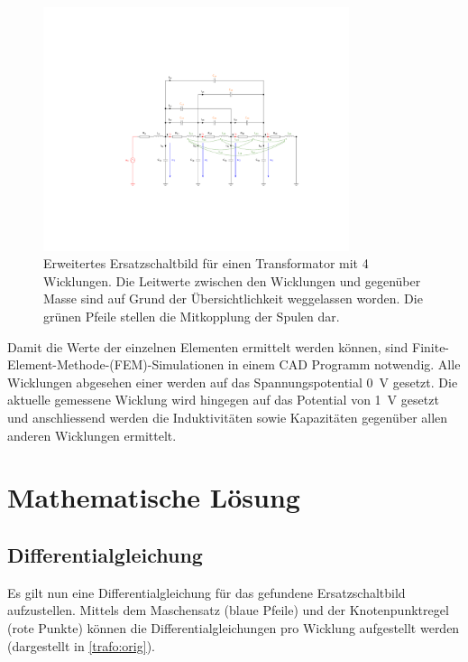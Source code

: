 \begin{refsection}
\begin{figure}
	\centering
	\includegraphics[width=0.8\textwidth]{trafo/Trafo_Modell.pdf}
	\caption[Erweitertes Ersatzschaltbild für einen Transformator]{Erweitertes Ersatzschaltbild für einen Transformator mit 4 Wicklungen. Die Leitwerte zwischen den Wicklungen und gegenüber Masse sind auf Grund der Übersichtlichkeit weggelassen worden. Die grünen Pfeile stellen die Mitkopplung der Spulen dar. }
	\label{trafo:erweitertes_ESB}
\end{figure}

Damit die Werte der einzelnen Elementen ermittelt werden können, sind Finite-Element-Methode-(FEM)-Simulationen in einem CAD Programm notwendig. Alle Wicklungen abgesehen einer werden auf das Spannungspotential \SI{0}{\volt} gesetzt. Die aktuelle gemessene Wicklung wird hingegen auf das Potential von \SI{1}{\volt} gesetzt und anschliessend werden die Induktivitäten sowie Kapazitäten gegenüber allen anderen Wicklungen ermittelt.


\section{Mathematische Lösung}
\subsection{Differentialgleichung}

Es gilt nun eine Differentialgleichung für das gefundene Ersatzschaltbild aufzustellen. Mittels dem Maschensatz (blaue Pfeile) und der Knotenpunktregel (rote Punkte) können die Differentialgleichungen pro Wicklung aufgestellt werden (dargestellt in \ref{trafo:orig}).


\end{refsection}
